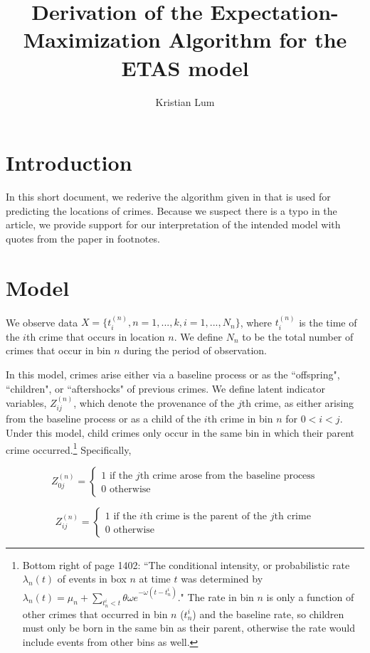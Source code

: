 \documentclass[12pt]{amsart}
\title{Derivation of the Expectation-Maximization Algorithm for the ETAS model}
\author{Kristian Lum}
\begin{document}
\maketitle
\section{Introduction}
In this short document, we rederive the algorithm given in \cite{Mohler:2015aa} that is used for predicting the locations of crimes. Because we suspect there is a typo in the article, we provide support for our interpretation of the intended model with quotes from the paper in footnotes.

\section{Model}
We observe data $X = \{t_i^{(n)}, n = 1, ..., k, i = 1, ..., N_n\}$, where $t_i^{(n)}$ is the time of the $i$th crime that occurs in location $n$. We define $N_n$ to be the total number of crimes that occur in bin $n$ during the period of observation. 

In this model, crimes arise either via a baseline process or as the ``offspring", ``children", or ``aftershocks" of previous crimes. We define latent indicator variables, $Z_{ij}^{(n)}$, which denote the provenance of the $j$th crime, as either arising from the baseline process or as a child of the $i$th crime in bin $n$   
 for $0< i < j$. Under this model, child crimes only occur in the same bin in which their parent crime occurred.\footnote{Bottom right of page 1402: ``The conditional intensity, or probabilistic rate $\lambda_n(t)$ of events in box $n$ at time $t$ was determined by
$\lambda_n( t ) = \mu_n +\sum_{t^i_n < t} \theta \omega e^{-\omega(t - t_n^i)}$." The rate in bin $n$ is only a function of other crimes that occurred in bin $n$ ($t^i_n$) and the baseline rate, so children must only be born in the same bin as their parent, otherwise the rate would include events from other bins as well.} Specifically,

\begin{equation*}
Z_{0j}^{(n)}  =
\begin{cases}
1 \text{ if the $j$th crime arose from the baseline process} \\
0 \text{ otherwise}
\end{cases}
\end{equation*}

\begin{equation*}
Z_{ij}^{(n)}  =
\begin{cases}
1 \text{ if the $i$th crime is the parent of the $j$th crime} \\
0 \text{ otherwise}
\end{cases}
\end{equation*}
\end{document}
